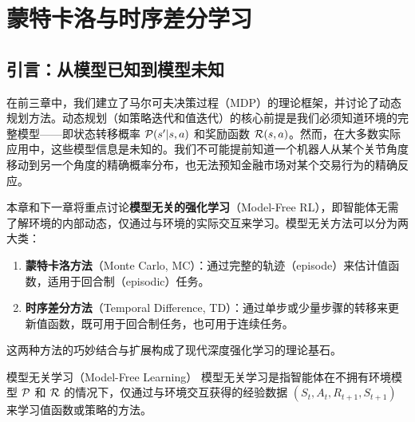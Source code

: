 \chapter{蒙特卡洛与时序差分学习}


\section{引言：从模型已知到模型未知}

在前三章中，我们建立了马尔可夫决策过程（MDP）的理论框架，并讨论了动态规划方法。动态规划（如策略迭代和值迭代）的核心前提是我们必须知道环境的完整模型——即状态转移概率 $\mathcal{P}(s'|s,a)$ 和奖励函数 $\mathcal{R}(s,a)$。然而，在大多数实际应用中，这些模型信息是未知的。我们不可能提前知道一个机器人从某个关节角度移动到另一个角度的精确概率分布，也无法预知金融市场对某个交易行为的精确反应。

本章和下一章将重点讨论\textbf{模型无关的强化学习}（Model-Free RL），即智能体无需了解环境的内部动态，仅通过与环境的实际交互来学习。模型无关方法可以分为两大类：

\begin{enumerate}
    \item \textbf{蒙特卡洛方法}（Monte Carlo, MC）：通过完整的轨迹（episode）来估计值函数，适用于回合制（episodic）任务。
    \item \textbf{时序差分方法}（Temporal Difference, TD）：通过单步或少量步骤的转移来更新值函数，既可用于回合制任务，也可用于连续任务。
\end{enumerate}

这两种方法的巧妙结合与扩展构成了现代深度强化学习的理论基石。

\begin{mydefinition}{模型无关学习（Model-Free Learning）}
模型无关学习是指智能体在不拥有环境模型 $\mathcal{P}$ 和 $\mathcal{R}$ 的情况下，仅通过与环境交互获得的经验数据 $(S_t, A_t, R_{t+1}, S_{t+1})$ 来学习值函数或策略的方法。
\end{mydefinition}

